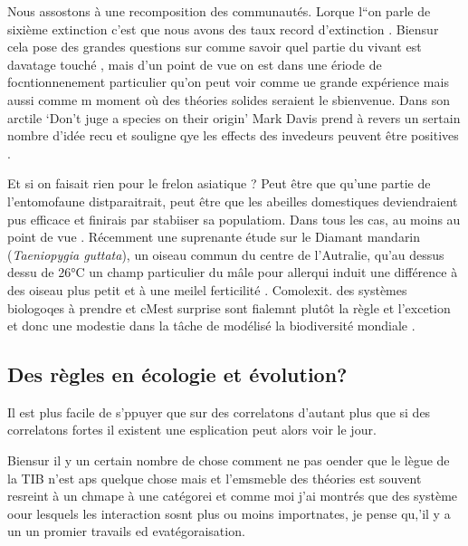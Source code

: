 Nous assostons à une recomposition des communautés. Lorque l``on parle
de sixième extinction c'est que nous avons des taux record d'extinction
\citep{Thomas2004}. Biensur cela pose des grandes questions sur comme
savoir quel partie du vivant est davatage touché \citep{Thuiller2011},
mais d'un point de vue on est dans une ériode de focntionnenement
particulier qu'on peut voir comme ue grande expérience mais aussi comme
m moment où des théories solides seraient le sbienvenue. Dans son
arctile `Don't juge a species on their origin' Mark Davis prend à revers
un sertain nombre d'idée recu et souligne qye les effects des invedeurs
peuvent être positives \citet{Davis2011}.

Et si on faisait rien pour le frelon asiatique ? Peut être que qu'une
partie de l'entomofaune distparaitrait, peut être que les abeilles
domestiques deviendraient pus efficace et finirais par stabiiser sa
populatiom. Dans tous les cas, au moins au point de vue
\citep{Villemant2011}. Récemment une suprenante étude sur le Diamant
mandarin (\emph{Taeniopygia guttata}), un oiseau commun du centre de
l'Autralie, qu'au dessus dessu de 26°C un champ particulier du mâle pour
allerqui induit une différence à des oiseau plus petit et à une meilel
ferticilité \citep{Mariette2016}. Comolexit. des systèmes biologoqes à
prendre et cMest surprise sont fialemnt plutôt la règle et l'excetion et
donc une modestie dans la tâche de modélisé la biodiversité mondiale
\citep{Mouquet2015}.

\subsection*{Des règles en écologie et
évolution?}\label{des-ruxe8gles-en-uxe9cologie-et-uxe9volution}

Il est plus facile de s'ppuyer que sur des correlatons d'autant plus que
si des correlatons fortes il existent une esplication peut alors voir le
jour.

Biensur il y un certain nombre de chose comment ne pas oender que le
lègue de la TIB n'est aps quelque chose mais et l'emsmeble des théories
est souvent resreint à un chmape à une catégorei et comme moi j'ai
montrés que des système oour lesquels les interaction sosnt plus ou
moins importnates, je pense qu,'il y a un un promier travails ed
evatégoraisation.

